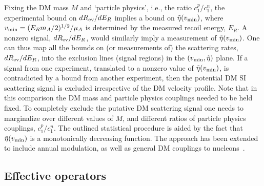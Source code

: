 Fixing the DM mass $M$ and `particle physics', i.e., the ratio $c_1^p/c_1^n$,  
the experimental bound on ${d R_{\rm ev}}/{dE_R}$ 
implies a bound on $\tilde  \eta(v_{\rm min})$, where $v_{\rm min}=(E_R m_A/2)^{1/2}/\mu_A$ is determined by the measured recoil energy, $E_R$. A nonzero  signal, ${d R_{\rm ev}}/{dE_R}$,  would similarly imply a measurement of $\tilde  \eta(v_{\rm min})$. One can thus map all the bounds on (or measurements of) the scattering rates, ${d R_{\rm ev}}/{dE_R}$,  into the exclusion lines (signal regions) in the $(v_{\rm min},\tilde \eta)$ plane. If a signal from one experiment, translated to a nonzero value of $\tilde \eta (v_{\rm min})$, is contradicted by a bound from another experiment, then the potential DM SI scattering signal is excluded irrespective of the DM velocity profile. Note that in this comparison  the DM mass and particle physics couplings needed to be held fixed. To completely exclude the putative DM scattering signal one needs to marginalize over different values of $M$, and different ratios of particle physics couplings, $c_1^p/c_1^n$. 
The outlined statistical procedure is aided by the fact that $\tilde \eta(v_{\rm min})$ is a monotonically decreasing function.
The approach has been extended to include annual modulation, as well as general DM couplings  to nucleons~\cite{Astro:out}.




\subsection{Effective operators}\label{sec:Effective:operators}

